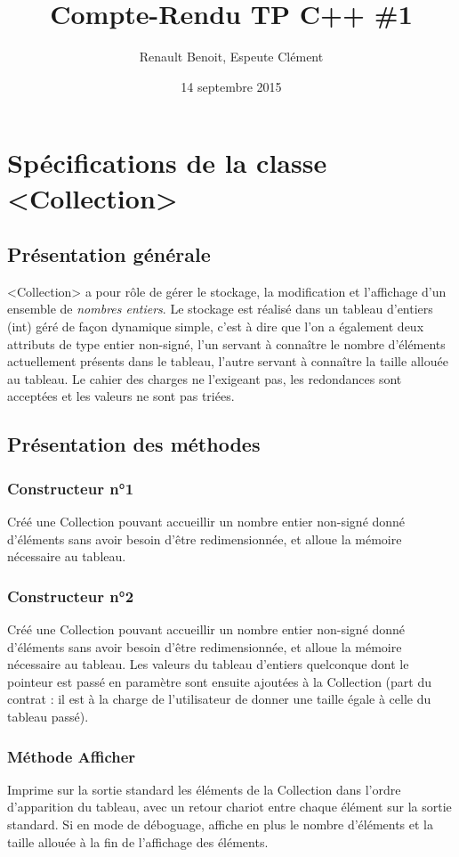 \documentclass[11pt]{article}
\title{Compte-Rendu TP C++ \#1}
\author{{\sc Renault} Benoit, {\sc Espeute} Clément}
\date{14 septembre 2015}
\begin{document}
\pagestyle{fancy}
\maketitle

\section[Spécifications]{Spécifications de la classe <Collection>}

\subsection{Présentation générale}
<Collection> a pour rôle de gérer le stockage, la modification et l'affichage d'un ensemble de \emph{nombres entiers}. Le stockage est réalisé dans un tableau d'entiers (int) géré de façon dynamique simple, c'est à dire que l'on a également deux attributs de type entier non-signé, l'un servant à connaître le nombre d'éléments actuellement présents dans le tableau, l'autre servant à connaître la taille allouée au tableau. Le cahier des charges ne l'exigeant pas, les redondances sont acceptées et les valeurs ne sont pas triées.

\subsection{Présentation des méthodes}

\subsubsection*{Constructeur n°1}
Créé une Collection pouvant accueillir un nombre entier non-signé donné d'éléments sans avoir besoin d'être redimensionnée, et alloue la mémoire nécessaire au tableau.

\subsubsection*{Constructeur n°2}
Créé une Collection pouvant accueillir un nombre entier non-signé donné d'éléments sans avoir besoin d'être redimensionnée, et alloue la mémoire nécessaire au tableau. Les valeurs du tableau d'entiers quelconque dont le pointeur est passé en paramètre sont ensuite ajoutées à la Collection (part du contrat : il est à la charge de l’utilisateur de donner une taille égale à celle du tableau passé).

\subsubsection*{Méthode Afficher}
Imprime sur la sortie standard les éléments de la Collection dans l'ordre d’apparition du tableau, avec un retour chariot entre chaque élément sur la sortie standard. Si en mode de déboguage, affiche en plus le nombre d’éléments et la taille allouée à la fin de l’affichage des éléments.
\end{document}
